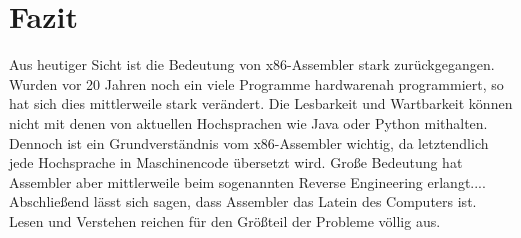 \section{Fazit}
Aus heutiger Sicht ist die Bedeutung von x86-Assembler stark zurückgegangen. Wurden vor 20 Jahren noch ein viele Programme hardwarenah programmiert, so hat sich dies mittlerweile stark verändert. Die Lesbarkeit und Wartbarkeit können nicht mit denen von aktuellen Hochsprachen wie Java oder Python mithalten. Dennoch ist ein Grundverständnis vom x86-Assembler wichtig, da letztendlich jede Hochsprache in Maschinencode übersetzt wird.
Große Bedeutung hat Assembler aber mittlerweile beim sogenannten Reverse Engineering erlangt....
Abschließend lässt sich sagen, dass Assembler das Latein des Computers ist. Lesen und Verstehen reichen für den Größteil der Probleme völlig aus.
